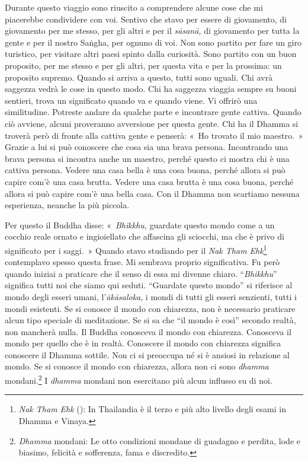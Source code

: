 Durante questo viaggio sono riuscito a comprendere alcune cose che mi
piacerebbe condividere con voi. Sentivo che stavo per essere di
giovamento, di giovamento per me stesso, per gli altri e per il
\emph{sāsanā,} di giovamento per tutta la gente e per il nostro Saṅgha,
per ognuno di voi. Non sono partito per fare un giro turistico, per
visitare altri paesi spinto dalla curiosità. Sono partito con un buon
proposito, per me stesso e per gli altri, per questa vita e per la
prossima: un proposito supremo. Quando si arriva a questo, tutti sono
uguali. Chi avrà saggezza vedrà le cose in questo modo. Chi ha saggezza
viaggia sempre su buoni sentieri, trova un significato quando va e
quando viene. Vi offrirò una similitudine. Potreste andare da qualche
parte e incontrare gente cattiva. Quando ciò avviene, alcuni proveranno
avversione per questa gente. Chi ha il Dhamma si troverà però di fronte
alla cattiva gente e penserà: «~Ho trovato il mio maestro.~» Grazie a
lui si può conoscere che cosa sia una brava persona. Incontrando una
brava persona si incontra anche un maestro, perché questo ci mostra chi
è una cattiva persona. Vedere una casa bella è una cosa buona, perché
allora si può capire com'è una casa brutta. Vedere una casa brutta è una
cosa buona, perché allora si può capire com'è una bella casa. Con il
Dhamma non scartiamo nessuna esperienza, neanche la più piccola.

Per questo il Buddha disse: «~\emph{Bhikkhu}, guardate questo mondo come
a un cocchio reale ornato e ingioiellato che affascina gli sciocchi, ma
che è privo di significato per i saggi.~» Quando stavo studiando per il
\emph{Nak Tham Ehk}\footnote{\emph{Nak Tham Ehk} (): In
  Thailandia è il terzo e più alto livello degli esami in Dhamma e
  Vinaya.} contemplavo spesso questa frase. Mi sembrava proprio
significativa. Fu però quando iniziai a praticare che il senso di essa
mi divenne chiaro. ``\emph{Bhikkhu}'' significa tutti noi che siamo qui
seduti. ``Guardate questo mondo'' si riferisce al mondo degli esseri
umani, l'\emph{ākāsaloka}, i mondi di tutti gli esseri senzienti, tutti
i mondi esistenti. Se si conosce il mondo con chiarezza, non è
necessario praticare alcun tipo speciale di meditazione. Se si sa che
``il mondo è così'' secondo realtà, non mancherà nulla. Il Buddha
conosceva il mondo con chiarezza. Conosceva il mondo per quello che è in
realtà. Conoscere il mondo con chiarezza significa conoscere il Dhamma
sottile. Non ci si preoccupa né si è ansiosi in relazione al mondo. Se
si conosce il mondo con chiarezza, allora non ci sono \emph{dhamma}
mondani.\footnote{\emph{Dhamma} mondani: Le otto condizioni mondane di
  guadagno e perdita, lode e biasimo, felicità e sofferenza, fama e
  discredito.} I \emph{dhamma} mondani non esercitano più alcun influsso
su di noi.

